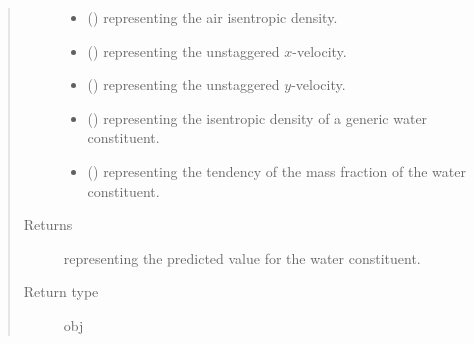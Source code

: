 \documentclass[letterpaper,10pt,english]{sphinxmanual}
\begin{document}
\begin{fulllineitems}
\begin{fulllineitems}
\begin{quote}
\begin{description}
\begin{itemize}
\item {} 
 () \textendash{}  representing the air isentropic density.

\item {} 
 () \textendash{}  representing the unstaggered \(x\)-velocity.

\item {} 
 () \textendash{}  representing the unstaggered \(y\)-velocity.

\item {} 
 () \textendash{}  representing the isentropic density of a generic water constituent.

\item {} 
 () \textendash{}  representing the tendency of the mass fraction of the water constituent.

\end{itemize}

\item[{Returns}] \leavevmode
{} representing the predicted value for the water constituent.

\item[{Return type}] \leavevmode
obj

\end{description}\end{quote}

\end{fulllineitems}



\end{fulllineitems}
\end{document}
